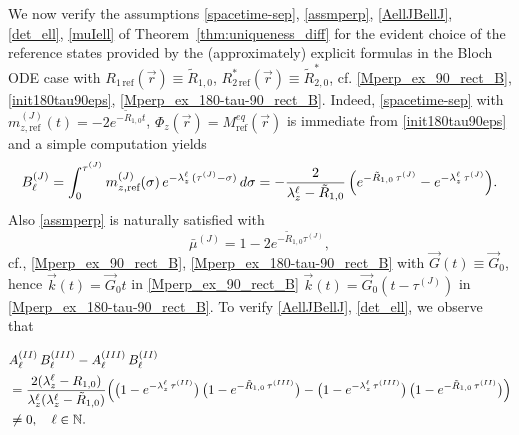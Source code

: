 \documentclass{ws-m3as}
\newcommand{\skipsimple}[1]{}
\begin{document}
\begin{remark}\label{rem:refstates} 
We now verify the assumptions \eqref{spacetime-sep}, \eqref{assmperp}, 
\eqref{AellJBellJ}, \eqref{det_ell}, \eqref{muIell}
of Theorem~\ref{thm:uniqueness_diff} for the evident choice of the reference states provided by the (approximately) explicit formulas in the Bloch ODE case with $R_{1\,\text{ref}}(\vec r)\equiv\tilde{R}_{1,0}$, $R_{2\,\text{ref}}^*(\vec r)\equiv\tilde{R}_{2,0}^*$, cf. \eqref{Mperp_ex_90_rect_B}, \eqref{init180tau90eps}, \eqref{Mperp_ex_180-tau-90_rect_B}. 
Indeed, \eqref{spacetime-sep} with $m_{z,\text{ref}}^{(J)}(t)=-2e^{-\tilde{R}_{1,0}t}$, $\Phi_z(\vec r)=M^{eq}_{\text{ref}}(\vec r)$ is immediate from \eqref{init180tau90eps} %
and a simple computation yields
\[
B_\ell^{(J)}=
\int_0^{\tau^{(J)}} m_{z,\text{ref}}^{(J)}(\sigma)\,e^{-\lambda_z^\ell\,(\tau^{(J)}-\sigma)}\, d\sigma
= - \frac{2}{\lambda_z^\ell-\tilde{R}_{1,0}}\, 
\Bigl(e^{-\tilde{R}_{1,0}\,\tau^{(J)}}-e^{-\lambda_z^\ell\,\tau^{(J)}}\Bigr).
\]
Also \eqref{assmperp} is naturally satisfied with 
\[
\bar{\mu}^{(J)}=1-2e^{-\tilde{R}_{1,0}\tau^{(J)}}, 
\]
cf., \eqref{Mperp_ex_90_rect_B}, \eqref{Mperp_ex_180-tau-90_rect_B} with ${\vec G}(t)\equiv{\vec G}_0$, hence 
${\vec k}(t)={\vec G}_0t$ in \eqref{Mperp_ex_90_rect_B} 
${\vec k}(t)={\vec G}_0(t-\tau^{(J)})$ in \eqref{Mperp_ex_180-tau-90_rect_B}.
To verify \eqref{AellJBellJ}, \eqref{det_ell}, we observe that 
\skipsimple{
\[
\begin{aligned}
A_\ell^{(J)}
&=\frac{\lambda_z^\ell-R_{1,0}}{\lambda_z^\ell}
+\frac{\lambda_z^\ell+R_{1,0}}{\lambda_z^\ell} e^{-\lambda_z^\ell\,\tau^{(J)}} 
-2 e^{-\tilde{R}_{1,0}\,\tau^{(J)}}
\\
&=(\lambda_z^\ell-\tilde{R}_{1,0})B_\ell^{(J)}
+\frac{\lambda_z^\ell-R_{1,0}}{\lambda_z^\ell}
\bigl(1-e^{-\lambda_z^\ell\,\tau^{(J)}}\bigr)
\\[1ex]
B_\ell^{(J)}
&=
\frac{2}{\lambda_z^\ell-\tilde{R}_{1,0}}
\Bigl(\bigl(1-e^{-\tilde{R}_{1,0}\,\tau^{(J)}}\bigr)
-\bigl(1-e^{-\lambda_z^\ell\,\tau^{(J)}}\bigr)\Bigr)
\end{aligned}
\]
hence by linearity of the determinant
}
\[
\begin{aligned}
&A_\ell^{(II)}\, B_\ell^{(III)}-A_\ell^{(III)}\, B_\ell^{(II)}\\
&\skipsimple{
=\frac{\lambda_z^\ell-R_{1,0}}{\lambda_z^\ell}
\Bigl(
\bigl(1-e^{-\lambda_z^\ell\,\tau^{(II)}}\bigr)\, B_\ell^{(III)}-\bigl(1-e^{-\lambda_z^\ell\,\tau^{(III)}}\bigr)\, B_\ell^{(II)}
\Bigr)
}
=\frac{2(\lambda_z^\ell-R_{1,0})}{\lambda_z^\ell(\lambda_z^\ell-\tilde{R}_{1,0})}
\Bigl(
\bigl(1-e^{-\lambda_z^\ell\,\tau^{(II)}}\bigr)\, \bigl(1-e^{-\tilde{R}_{1,0}\,\tau^{(III)}}\bigr)
-\bigl(1-e^{-\lambda_z^\ell\,\tau^{(III)}}\bigr)\, \bigl(1-e^{-\tilde{R}_{1,0}\,\tau^{(II)}}\bigr)
\Bigr)\\
&\not=0, \quad \ell\in\mathbb{N}.
\end{aligned}
\]


\end{remark}
\end{document}
